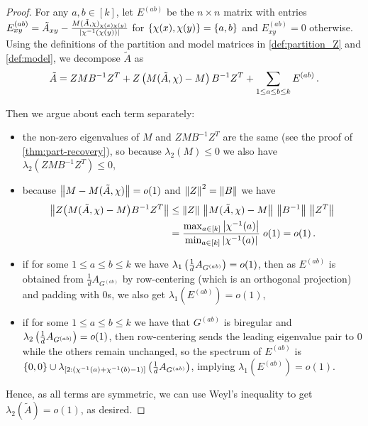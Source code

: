 \begin{proof}
    For any $a,b\in[k]$, let $E^{(ab)}$ be the $n\times n$ matrix with entries $E^{(ab)}_{xy}=\tilde{A}_{xy}-\frac{M(\tilde{A},\chi)_{\chi(x)\chi(y)}}{\left\lvert\chi^{-1}(\chi(y))\right\rvert}$ for $\left\{\chi(x), \chi(y)\right\}=\left\{a, b\right\}$ and $E^{(ab)}_{xy}=0$ otherwise.
    Using the definitions of the partition and model matrices in \cref{def:partition_Z} and \cref{def:model}, we decompose $\tilde{A}$ as
    $$\tilde{A}=ZMB^{-1}Z^T+Z\left(M(\tilde{A},\chi)-M\right)B^{-1}Z^T+\sum_{1\leq a\leq b\leq k} E^{(ab)}\,.$$

    Then we argue about each term separately:
    \begin{itemize}
        \item the non-zero eigenvalues of $M$ and $ZMB^{-1}Z^T$ are the same (see the proof of \cref{thm:part-recovery}), so because $\lambda_2(M)\leq 0$ we also have $\lambda_2(ZMB^{-1}Z^T)\leq 0$,
        \item because $\left\lVert M-M(\tilde{A},\chi)\right\rVert=o(1)$ and $\left\lVert Z\right\rVert^2=\left\lVert B\right\rVert$ we have
        \begin{equation*}  %
            \begin{split}
              \Norm{Z\bigl(M(\tilde A,\chi)-M\bigr)B^{-1}Z^T}
              &\le \Norm{Z}\,\Norm{M(\tilde A,\chi)-M}\,\Norm{B^{-1}}\,\Norm{Z^T}\\
              &= \frac{\max_{a\in[k]}\Abs{\chi^{-1}(a)}}
                     {\min_{a\in[k]}\Abs{\chi^{-1}(a)}}\;o(1)
                = o(1)\,.
            \end{split}
          \end{equation*}          
        \item if for some $1\leq a \leq b\leq k$ we have $\lambda_1\left(\frac{1}{d}A_{G^{(ab)}}\right) = o(1)$, then as $E^{(ab)}$ is obtained from $\frac{1}{d}A_{G^{(ab)}}$ by row-centering (which is an orthogonal projection) and padding with $0$s, we also get $\lambda_1(E^{(ab)})=o(1)$,
        \item if for some $1\leq a \leq b\leq k$ we have that $G^{(ab)}$ is biregular and $\lambda_2\left(\frac{1}{d}A_{G^{(ab)}}\right) = o(1)$, then row-centering sends the leading eigenvalue pair to $0$ while the others remain unchanged, so the spectrum of $E^{(ab)}$ is $\left\{0, 0\right\}\cup \lambda_{\left[2\mathclose{:}\left(\chi^{-1}(a)+\chi^{-1}(b)-1\right)\right]}\left(\frac{1}{d}A_{G^{(ab)}}\right)$, implying $\lambda_1(E^{(ab)})=o(1)$.
    \end{itemize}
    Hence, as all terms are symmetric, we can use Weyl's inequality to get $\lambda_2(\tilde{A})=o(1)$, as desired.
\end{proof}


